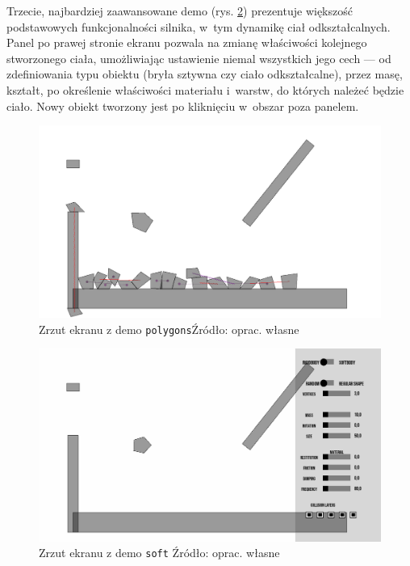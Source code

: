Trzecie, najbardziej zaawansowane demo (rys. \ref{fig:demo-softbody}) prezentuje większość podstawowych funkcjonalności silnika, w~tym dynamikę ciał odkształcalnych. Panel po prawej stronie ekranu pozwala na zmianę właściwości kolejnego stworzonego ciała, umożliwiając ustawienie niemal wszystkich jego cech --- od zdefiniowania typu obiektu (bryła sztywna czy ciało odkształcalne), przez masę, kształt, po określenie właściwości materiału i~warstw, do których należeć będzie ciało. Nowy obiekt tworzony jest po kliknięciu w~obszar poza panelem.

\begin{figure}[h!]
	\centering
	\includegraphics[width=0.9\linewidth]{images/screenshot-polygons}
	\caption[Zrzut ekranu z demo \texttt{polygons}]{Zrzut ekranu z demo \texttt{polygons}\newline Źródło: oprac. własne}
	\label{fig:demo-polygons}
\end{figure}

\begin{figure}[h!]
	\centering
	\includegraphics[width=0.9\linewidth]{images/screenshot-soft}
	\caption[Zrzut ekranu z demo \texttt{soft}]{Zrzut ekranu z demo \texttt{soft} \newline Źródło: oprac. własne}
	\label{fig:demo-softbody}
\end{figure}

